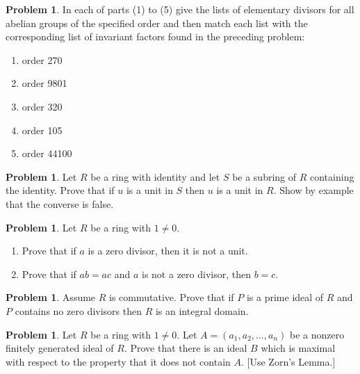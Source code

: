 \documentclass{amsart}
\numberwithin{equation}{section}
\theoremstyle{definition}
\newtheorem{problem}[thm]{Problem}
\begin{document}
\begin{problem}
  In each of parts (1) to (5) give the lists of elementary divisors
  for all abelian groups of the specified order and then match each
  list with the corresponding list of invariant factors found
  in the preceding problem:
\begin{enumerate}
\item order 270
\item order 9801
\item order 320
\item order 105
\item order 44100
\end{enumerate}
\end{problem}


\begin{problem}
  Let \(R\) be a ring with identity and let \(S\) be a subring of
  \(R\) containing the identity. Prove that if \(u\) is a unit in
  \(S\) then \(u\) is a unit in \(R\). Show by example that the
  converse is false.
\end{problem}

\begin{problem}
  Let \( R \) be a ring with \( 1\ne 0 \).
  \begin{enumerate}
  \item Prove that if \( a \) is a zero divisor, then it is not a
    unit.
  \item Prove that if \( ab=ac \) and \( a \) is not a zero divisor,
  then \( b=c \).
  \end{enumerate}
\end{problem}

\begin{problem}
 Assume \(R\) is commutative. Prove that if \(P\) is a prime ideal of \(R\) and \(P\) contains no zero divisors then \(R\) is an integral domain. 
\end{problem}

\begin{problem}
  Let \( R \) be a ring with \( 1\ne 0 \).
  Let \(A=\left(a_1, a_2, \ldots, a_n\right)\) be a nonzero finitely
  generated ideal of \(R\). Prove that there is an ideal \(B\) which
  is maximal with respect to the property that it does not contain
  \(A\). [Use Zorn’s Lemma.]
\end{problem}
\end{document}
